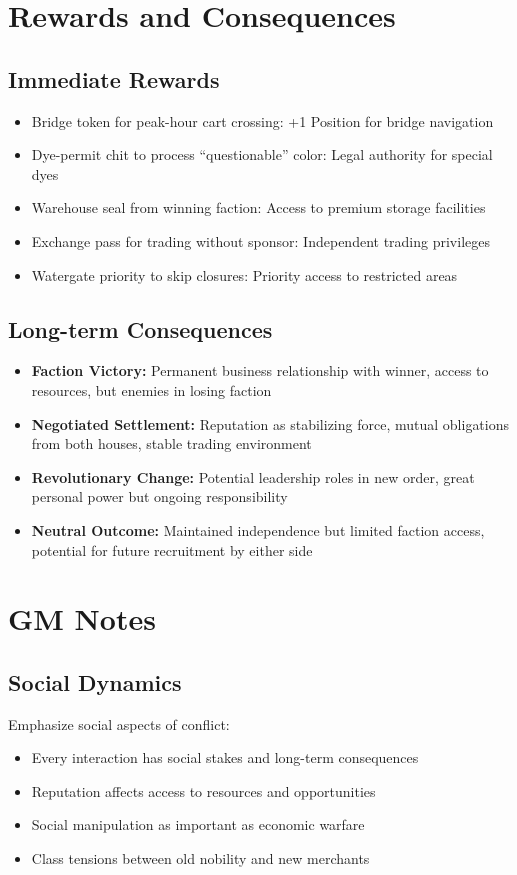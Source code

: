 \documentclass[11pt]{article}
\begin{document}
\section{Rewards and Consequences}

\subsection{Immediate Rewards}
\begin{itemize}
\item Bridge token for peak-hour cart crossing: +1 Position for bridge navigation
\item Dye-permit chit to process ``questionable'' color: Legal authority for special dyes
\item Warehouse seal from winning faction: Access to premium storage facilities
\item Exchange pass for trading without sponsor: Independent trading privileges
\item Watergate priority to skip closures: Priority access to restricted areas
\end{itemize}

\subsection{Long-term Consequences}
\begin{itemize}
\item \textbf{Faction Victory:} Permanent business relationship with winner, access to resources, but enemies in losing faction
\item \textbf{Negotiated Settlement:} Reputation as stabilizing force, mutual obligations from both houses, stable trading environment
\item \textbf{Revolutionary Change:} Potential leadership roles in new order, great personal power but ongoing responsibility
\item \textbf{Neutral Outcome:} Maintained independence but limited faction access, potential for future recruitment by either side
\end{itemize}

\section{GM Notes}

\subsection{Social Dynamics}
Emphasize social aspects of conflict:
\begin{itemize}
\item Every interaction has social stakes and long-term consequences
\item Reputation affects access to resources and opportunities
\item Social manipulation as important as economic warfare
\item Class tensions between old nobility and new merchants
\end{itemize}
\end{document}
